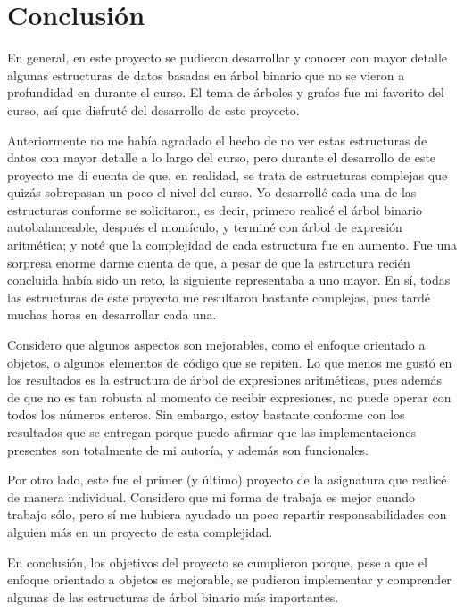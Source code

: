 \documentclass[letterpaper, 11pt]{article}
\begin{document}
	\newpage
	
	\section*{\centering Conclusión}
	
	En general, en este proyecto se pudieron desarrollar y conocer con mayor detalle algunas estructuras de datos basadas en árbol binario que no se vieron a profundidad en durante el curso. El tema de árboles y grafos fue mi favorito del curso, así que disfruté del desarrollo de este proyecto. 
	
	Anteriormente no me había agradado el hecho de no ver estas estructuras de datos con mayor detalle a lo largo del curso, pero durante el desarrollo de este proyecto me di cuenta de que, en realidad, se trata de estructuras complejas que quizás sobrepasan un poco el nivel del curso. Yo desarrollé cada una de las estructuras conforme se solicitaron, es decir, primero realicé el árbol binario autobalanceable, después el montículo, y terminé con árbol de expresión aritmética; y noté que la complejidad de cada estructura fue en aumento. Fue una sorpresa enorme darme cuenta de que, a pesar de que la estructura recién concluida había sido un reto, la siguiente representaba a uno mayor. En sí, todas las estructuras de este proyecto me resultaron bastante complejas, pues tardé muchas horas en desarrollar cada una. 
	
	Considero que algunos aspectos son mejorables, como el enfoque orientado a objetos, o algunos elementos de código que se repiten. Lo que menos me gustó en los resultados es la estructura de árbol de expresiones aritméticas, pues además de que no es tan robusta al momento de recibir expresiones, no puede operar con todos los números enteros. Sin embargo, estoy bastante conforme con los resultados que se entregan porque puedo afirmar que las implementaciones presentes son totalmente de mi autoría, y además son funcionales. 
	
	Por otro lado, este fue el primer (y último) proyecto de la asignatura que realicé de manera individual. Considero que mi forma de trabaja es mejor cuando trabajo sólo, pero sí me hubiera ayudado un poco repartir responsabilidades con alguien más en un proyecto de esta complejidad.
	
	En conclusión, los objetivos del proyecto se cumplieron porque, pese a que el enfoque orientado a objetos es mejorable, se pudieron implementar y comprender algunas de las estructuras de árbol binario más importantes.
	
\end{document}
